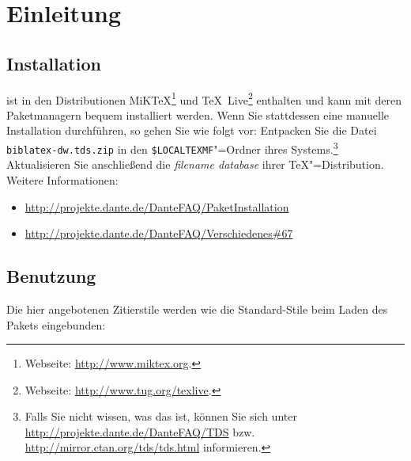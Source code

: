\documentclass[ngerman]{scrartcl}
\begin{document}
\maketitle
\thispagestyle{empty}


\lizenz
\screenversion
\TOC

\section{Einleitung}
\subsection{Installation}
\bldw{} ist in den Distributionen MiK\TeX{}\footnote{Webseite: \url{http://www.miktex.org}.} 
und \TeX{}~Live\footnote{Webseite: \url{http://www.tug.org/texlive}.} enthalten und
kann mit deren Paketmanagern bequem installiert werden. Wenn Sie stattdessen eine
manuelle Installation durchführen, so gehen Sie wie folgt vor:
Entpacken Sie die Datei \texttt{biblatex-dw.tds.zip} in den \texttt{\$LOCALTEXMF}"=Ordner ihres 
Systems.\footnote{Falls Sie nicht wissen, was das ist, können Sie sich unter 
\url{http://projekte.dante.de/DanteFAQ/TDS} bzw. 
\url{http://mirror.ctan.org/tds/tds.html} informieren.} Aktualisieren Sie 
anschließend die \emph{filename database} ihrer \TeX"=Distribution. 
Weitere Informationen:
\begin{itemize}
  \small
	\item \url{http://projekte.dante.de/DanteFAQ/PaketInstallation}
	\item \url{http://projekte.dante.de/DanteFAQ/Verschiedenes#67}
\end{itemize}
 
\subsection{Benutzung}
Die hier angebotenen Zitierstile werden wie die Standard-Stile
beim Laden des Pakets \bl{} eingebunden:
\end{document}
